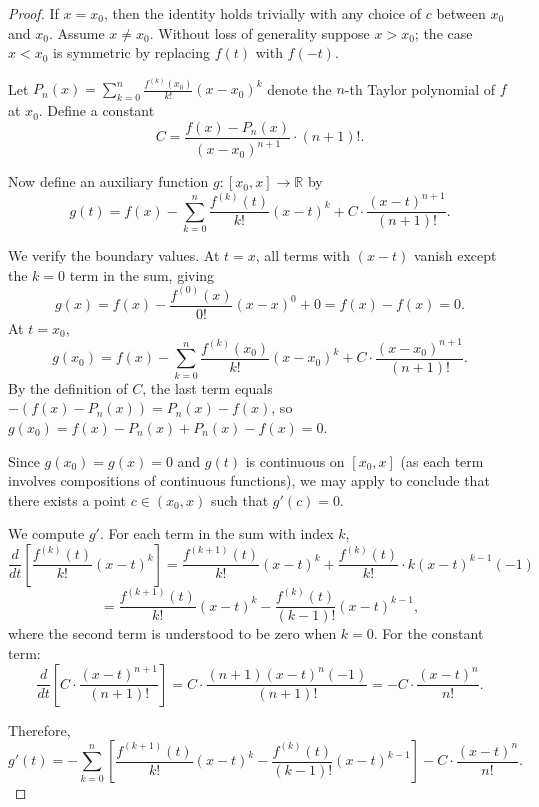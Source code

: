 \begin{proof}
    If $x = x_0$, then the identity holds trivially with any choice of $c$ between $x_0$ and $x_0$. Assume $x \neq x_0$. Without loss of generality suppose $x > x_0$; the case $x < x_0$ is symmetric by replacing $f(t)$ with $f(-t)$.

    Let $P_n(x) = \sum_{k=0}^n \frac{f^{(k)}(x_0)}{k!}(x - x_0)^k$ denote the $n$-th Taylor polynomial of $f$ at $x_0$. Define a constant
    $$C = \frac{f(x) - P_n(x)}{(x - x_0)^{n+1}} \cdot (n+1)!.$$

    Now define an auxiliary function $g : [x_0, x] \to \mathbb{R}$ by
    $$g(t) = f(x) - \sum_{k=0}^{n} \frac{f^{(k)}(t)}{k!}(x - t)^k + C \cdot \frac{(x - t)^{n+1}}{(n+1)!}.$$

    We verify the boundary values. At $t = x$, all terms with $(x-t)$ vanish except the $k=0$ term in the sum, giving
    $$g(x) = f(x) - \frac{f^{(0)}(x)}{0!}(x-x)^0 + 0 = f(x) - f(x) = 0.$$
    At $t = x_0$,
    $$g(x_0) = f(x) - \sum_{k=0}^n \frac{f^{(k)}(x_0)}{k!}(x - x_0)^k + C \cdot \frac{(x - x_0)^{n+1}}{(n+1)!}.$$
    By the definition of $C$, the last term equals $-(f(x) - P_n(x)) = P_n(x) - f(x)$, so $g(x_0) = f(x) - P_n(x) + P_n(x) - f(x) = 0$.

    Since $g(x_0) = g(x) = 0$ and $g(t)$ is continuous on $[x_0, x]$ (as each term involves compositions of continuous functions), we may apply  to conclude that there exists a point $c \in (x_0, x)$ such that $g'(c) = 0$.

    We compute $g'$. For each term in the sum with index $k$,
    $$\frac{d}{dt}\left[\frac{f^{(k)}(t)}{k!}(x - t)^k\right] = \frac{f^{(k+1)}(t)}{k!}(x-t)^k + \frac{f^{(k)}(t)}{k!} \cdot k(x-t)^{k-1}(-1)$$
    $$= \frac{f^{(k+1)}(t)}{k!}(x-t)^k - \frac{f^{(k)}(t)}{(k-1)!}(x-t)^{k-1},$$
    where the second term is understood to be zero when $k = 0$. For the constant term:
    $$\frac{d}{dt}\left[C \cdot \frac{(x-t)^{n+1}}{(n+1)!}\right] = C \cdot \frac{(n+1)(x-t)^n(-1)}{(n+1)!} = -C \cdot \frac{(x-t)^n}{n!}.$$

    Therefore,
    $$g'(t) = -\sum_{k=0}^n \left[\frac{f^{(k+1)}(t)}{k!}(x-t)^k - \frac{f^{(k)}(t)}{(k-1)!}(x-t)^{k-1}\right] - C \cdot \frac{(x-t)^n}{n!}.$$


\end{proof}
